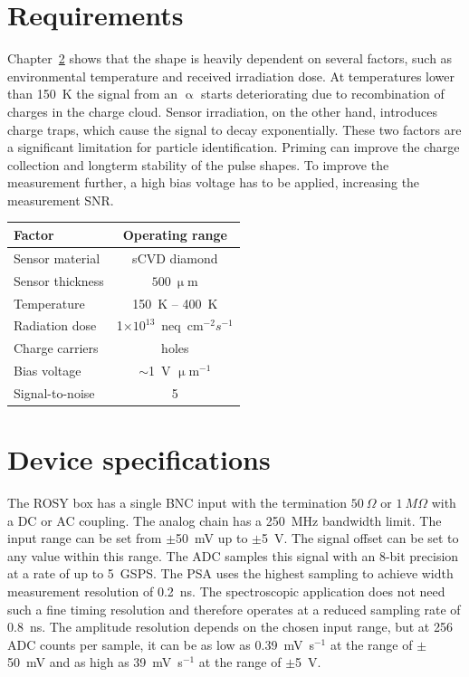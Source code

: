 \documentclass[12pt]{packages/mytustyle}  %
\begin{document}
\section{Requirements}
Chapter~\ref{} shows that the shape is heavily dependent on several factors, such as environmental temperature and received irradiation dose. At temperatures lower than 150~K the signal from an $\upalpha$ starts deteriorating due to recombination of charges in the charge cloud. Sensor irradiation, on the other hand, introduces charge traps, which cause the signal to decay exponentially. These two factors are a significant limitation for particle identification. Priming can improve the charge collection and longterm stability of the pulse shapes. To improve the measurement further, a high bias voltage has to be applied, increasing the measurement SNR. 
\begin{center}
\begin{tabular}{l*{1}{c}}
Factor              & Operating range \\
\hline
Sensor material & sCVD diamond \\
Sensor thickness & $500~\upmu$m \\
Temperature & 150~K -- 400~K \\
Radiation dose & 1$\times10^{13}$~neq~cm$^{-2} s^{-1}$ \\
Charge carriers & holes \\
Bias voltage & $\sim$1~V $\upmu$m$^{-1}$ \\
Signal-to-noise & 5 \\
\end{tabular}
\label{tab:limits}
\end{center}



\section{Device specifications}
The ROSY box has a single BNC input with the termination $50~\Omega$ or $1~M\Omega$ with a DC or AC coupling. The analog chain has a 250~MHz bandwidth limit. The input range can be set from $\pm$50~mV up to $\pm$5~V. The signal offset can be set to any value within this range. The ADC samples this signal with an 8-bit precision at a rate of up to 5~GSPS. The PSA uses the highest sampling to achieve width measurement resolution of 0.2~ns. The spectroscopic application does not need such a fine timing resolution and therefore operates at a reduced sampling rate of 0.8~ns. The amplitude resolution depends on the chosen input range, but at 256 ADC counts per sample, it can be as low as 0.39~mV~s$^{-1}$ at the range of $\pm$50~mV and as high as 39~mV~s$^{-1}$ at the range of $\pm$5~V.
\end{document}
